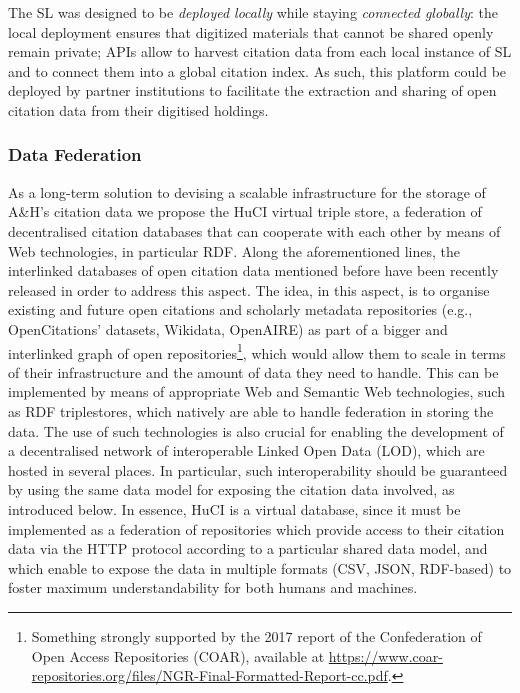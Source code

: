 The SL was designed to be \textit{deployed locally} while staying \textit{connected globally}: the local deployment ensures that digitized materials that cannot be shared openly remain private; APIs allow to harvest citation data from each local instance of SL and to connect them into a global citation index. As such, this platform could be deployed by partner institutions to facilitate the extraction and sharing of open citation data from their digitised holdings.


\subsubsection{Data Federation}

As a long-term solution to devising a scalable infrastructure for the storage of A\&H’s citation data we propose the HuCI virtual triple store, a federation of decentralised citation databases that can cooperate with each other by means of Web technologies, in particular RDF. Along the aforementioned lines, the interlinked databases of open citation data mentioned before have been recently released in order to address this aspect. The idea, in this aspect, is to organise existing and future open citations and scholarly metadata repositories (e.g., OpenCitations’ datasets, Wikidata, OpenAIRE) as part of a bigger and interlinked graph of open repositories\footnote{Something strongly supported by the 2017 report of the Confederation of Open Access Repositories (COAR), available at \url{https://www.coar-repositories.org/files/NGR-Final-Formatted-Report-cc.pdf}.}, which would allow them to scale in terms of their infrastructure and the amount of data they need to handle. This can be implemented by means of appropriate Web and Semantic Web technologies, such as RDF triplestores, which natively are able to handle federation in storing the data. The use of such technologies is also crucial for enabling the development of a decentralised network of interoperable Linked Open Data (LOD), which are hosted in several places. In particular, such interoperability should be guaranteed by using the same data model for exposing the citation data involved, as introduced below. In essence, HuCI is a virtual database, since it must be implemented as a federation of repositories which provide access to their citation data via the HTTP protocol according to a particular shared data model, and which enable to expose the data in multiple formats (CSV, JSON, RDF-based) to foster maximum understandability for both humans and machines. 

